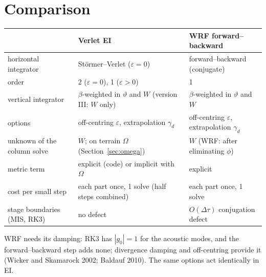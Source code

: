 \documentclass[11pt,a4paper]{article}
\newcommand{\dtau}{\Delta\tau}
\newcommand{\tv}{\vartheta}   %
\begin{document}
\section{Comparison}\label{sec:cmp}
\begin{center}\small
\begin{tabular}{p{3.6cm}p{5.2cm}p{5.2cm}}\toprule
& Verlet EI & WRF forward--backward\\\midrule
horizontal integrator & Störmer--Verlet ($\varepsilon=0$) & forward--backward (conjugate)\\
order & 2 ($\varepsilon=0$), 1 ($\varepsilon>0$) & 1\\
vertical integrator & $\beta$-weighted in $\tv$ and $W$ (version III: $W$ only) & $\beta$-weighted in $\tv$ and $W$\\
options & off-centring $\varepsilon$, extrapolation $\gamma_d$ & off-centring $\varepsilon$, extrapolation $\gamma_d$\\
unknown of the column solve & $W$; on terrain $\Omega$ (Section~\ref{sec:omega}) & $W$ (WRF: after eliminating $\phi$)\\
metric term & explicit (code) or implicit with $\Omega$ & explicit\\
cost per small step & each part once, 1 solve (half steps combined) & each part once, 1 solve\\
stage boundaries (MIS, RK3) & no defect & $O(\dtau)$ conjugation defect\\
\bottomrule\end{tabular}
\end{center}
WRF needs its damping: RK3 has $|g_0|=1$ for the acoustic modes, and the forward--backward step adds none;
divergence damping and off-centring provide it (Wicker and Skamarock 2002; Baldauf 2010). The same
options act identically in EI.

\end{document}
